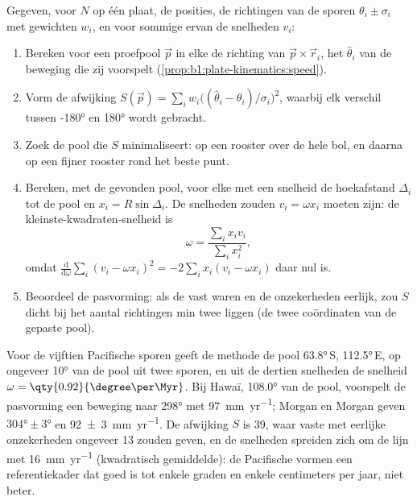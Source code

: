 \begin{method}\label{met:b1:hotspots:pole-fit}
Gegeven, voor $N$  op één plaat, de posities, de richtingen van de sporen $\theta_i \pm \sigma_i$ met gewichten $w_i$, en voor sommige ervan de snelheden $v_i$:
\begin{enumerate}
  \item Bereken voor een proefpool $\vec p$ in elke  de richting van
        $\vec p\times\vec r_i$, het  $\hat\theta_i$ van de beweging die
        zij voorspelt (\cref{prop:b1:plate-kinematics:speed}).
  \item Vorm de afwijking $S(\vec p) = \sum_i w_i\bigl((\hat\theta_i -
        \theta_i)/\sigma_i\bigr)^2$, waarbij elk verschil tussen \ang{-180} en
        \ang{180} wordt gebracht.
  \item Zoek de pool die $S$ minimaliseert: op een rooster over de hele bol,
        en daarna op een fijner rooster rond het beste punt.
  \item Bereken, met de gevonden pool, voor elke  met een snelheid de
        hoekafstand $\Delta_i$ tot de pool en $x_i = R\sin\Delta_i$. De
        snelheden zouden $v_i = \omega x_i$ moeten zijn: de kleinste-kwadraten-snelheid is
        \[
          \omega = \frac{\sum_i x_i v_i}{\sum_i x_i^2},
        \]
        omdat $\frac{\mathrm d}{\mathrm d\omega}\sum_i (v_i - \omega x_i)^2 =
        -2\sum_i x_i(v_i - \omega x_i)$ daar nul is.
  \item Beoordeel de pasvorming: als de  vast waren en de onzekerheden
        eerlijk, zou $S$ dicht bij het aantal richtingen min twee liggen (de twee
        coördinaten van de gepaste pool).
\end{enumerate}
\end{method}

Voor de vijftien Pacifische sporen geeft de methode de pool \ang{63.8}\,S, \ang{112.5}\,E, op ongeveer \ang{10} van de pool uit twee sporen, en uit de dertien snelheden de snelheid $\omega = \qty{0.92}{\degree\per\Myr}$. Bij Hawaï, \ang{108.0} van de pool, voorspelt de pasvorming een beweging naar \ang{298} met \qty{97}{mm.yr^{-1}}; Morgan en Morgan geven $\ang{304}\pm\ang{3}$ en \qty[uncertainty-mode=separate]{92 \pm 3}{mm.yr^{-1}}. De afwijking $S$ is 39, waar vaste  met eerlijke onzekerheden ongeveer 13 zouden geven, en de snelheden spreiden zich om de lijn met \qty{16}{mm.yr^{-1}} (kwadratisch gemiddelde): de Pacifische  vormen een referentiekader dat goed is tot enkele graden en enkele centimeters per jaar, niet beter.

